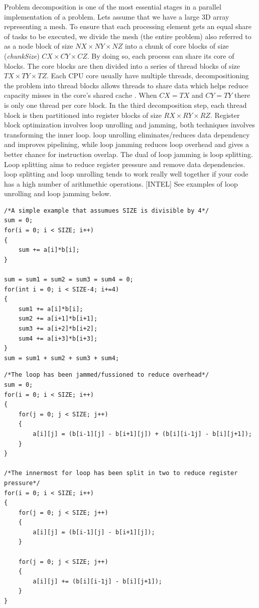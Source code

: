 Problem decomposition is one of the most essential stages in a parallel implementation of a problem. Lets assume that we have a large 3D array representing a mesh. To ensure that each processing element gets an equal share of tasks to be executed, we divide the mesh (the entire problem) also referred to as a node block of size \(NX \times NY \times NZ\) into a chunk of core blocks of size (\textit{chunkSize}) \(CX \times CY \times CZ\). By doing so, each process can share its core of blocks. The core blocks are then divided into a series of thread blocks of size \(TX \times TY \times TZ\). Each CPU core usually have multiple threads, decompositioning the problem into thread blocks allows threads to share data which helps reduce capacity misses in the core’s shared cache \cite{article9}. When \( CX = TX\) and \( CY = TY\) there is only one thread per core block. In the third decomposition step, each thread block is then partitioned into register blocks of size \(RX \times RY \times RZ\). Register block optimization involves loop unrolling and jamming, both techniques involves transforming the inner loop. loop unrolling eliminates/reduces data dependency and improves pipelining, while loop jamming reduces loop overhead and gives a better chance for instruction overlap\cite{article10}. The dual of loop jamming is loop splitting. Loop splitting aims to reduce register pressure and remove data dependencies. loop splitting and loop unrolling tends to work really well together if your code has a high number of arithmethic operations. [INTEL]  See examples of loop unrolling and loop jamming below. 

\begin{lstlisting}[caption=Loop unrolling]
/*A simple example that assumues SIZE is divisible by 4*/
sum = 0;
for(i = 0; i < SIZE; i++)
{
	sum += a[i]*b[i];
}

sum = sum1 = sum2 = sum3 = sum4 = 0;
for(int i = 0; i < SIZE-4; i+=4)
{
	sum1 += a[i]*b[i];
	sum2 += a[i+1]*b[i+1];
	sum3 += a[i+2]*b[i+2];
	sum4 += a[i+3]*b[i+3];
}
sum = sum1 + sum2 + sum3 + sum4;
\end{lstlisting}

\begin{lstlisting}[caption=Loop jamming and loop splitting]
/*The loop has been jammed/fussioned to reduce overhead*/
sum = 0;
for(i = 0; i < SIZE; i++)
{
	for(j = 0; j < SIZE; j++)
	{
		a[i][j] = (b[i-1][j] - b[i+1][j]) + (b[i][i-1j] - b[i][j+1]);
	}
}

/*The innermost for loop has been split in two to reduce register pressure*/
for(i = 0; i < SIZE; i++)
{
	for(j = 0; j < SIZE; j++)
	{
		a[i][j] = (b[i-1][j] - b[i+1][j]);
	}
	
	for(j = 0; j < SIZE; j++)
	{
		a[i][j] += (b[i][i-1j] - b[i][j+1]);
	}
}
\end{lstlisting}

